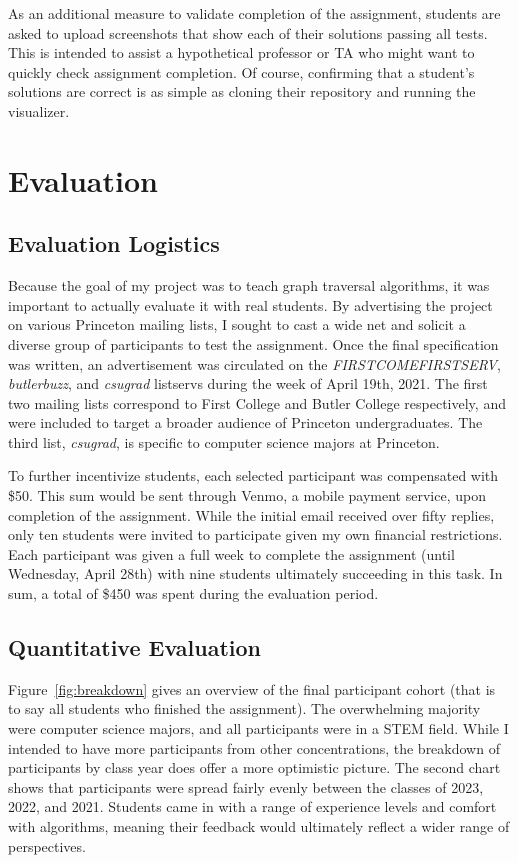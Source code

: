 \documentclass[pageno]{jpaper}
\begin{document}
As an additional measure to validate completion of the assignment, students are asked to upload screenshots that show each of their solutions passing all tests. This is intended to assist a hypothetical professor or TA who might want to quickly check assignment completion. Of course, confirming that a student's solutions are correct is as simple as cloning their repository and running the visualizer.

\section{Evaluation}

\subsection{Evaluation Logistics}

Because the goal of my project was to teach graph traversal algorithms, it was important to actually evaluate it with real students. By advertising the project on various Princeton mailing lists, I sought to cast a wide net and solicit a diverse group of participants to test the assignment. Once the final specification was written, an advertisement was circulated on the \emph{FIRSTCOMEFIRSTSERV}, \emph{butlerbuzz}, and \emph{csugrad} listservs during the week of April 19th, 2021. The first two mailing lists correspond to First College and Butler College respectively, and were included to target a broader audience of Princeton undergraduates. The third list, \emph{csugrad}, is specific to computer science majors at Princeton.

To further incentivize students, each selected participant was compensated with \$50. This sum would be sent through Venmo, a mobile payment service, upon completion of the assignment. While the initial email received over fifty replies, only ten students were invited to participate given my own financial restrictions. Each participant was given a full week to complete the assignment (until Wednesday, April 28th) with nine students ultimately succeeding in this task. In sum, a total of \$450 was spent during the evaluation period.

\subsection{Quantitative Evaluation}

Figure~\ref{fig:breakdown} gives an overview of the final participant cohort (that is to say all students who finished the assignment). The overwhelming majority were computer science majors, and all participants were in a STEM field. While I intended to have more participants from other concentrations, the breakdown of participants by class year does offer a more optimistic picture. The second chart shows that participants were spread fairly evenly between the classes of 2023, 2022, and 2021. Students came in with a range of experience levels and comfort with algorithms, meaning  their feedback would ultimately reflect a wider range of perspectives.
\end{document}
